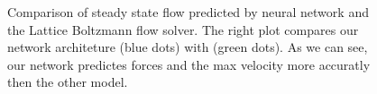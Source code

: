 \documentclass{article} %
\begin{document}
\begin{figure}[h]
\begin{center}
\end{center}
\caption{Comparison of steady state flow predicted by neural network and the Lattice Boltzmann flow solver. The right plot compares our network architeture (blue dots) with \citep{guo2016convolutional} (green dots). As we can see, our network predictes forces and the max velocity more accuratly then the other model. }
\label{flow_accuracy}
\end{figure}
\end{document}
